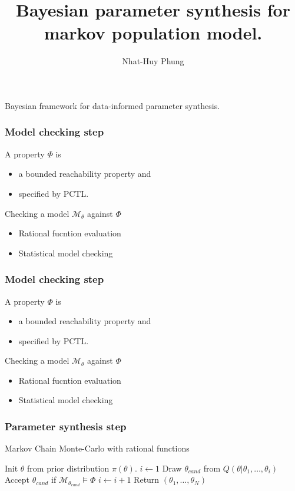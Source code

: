 \documentclass{beamer}
\title{Bayesian parameter synthesis for markov population model.}
\author{Nhat-Huy Phung}
\institute{University of Konstanz}
\begin{document}
\frame{\titlepage}

\begin{frame}
    \begin{center}
        \Huge Bayesian framework for data-informed parameter synthesis.
    \end{center}
\end{frame}

\begin{frame}
    \frametitle{Model checking step}
    A property $\Phi$ is
    \begin{itemize}
        \item a bounded reachability property and
        \item specified by PCTL.
    \end{itemize}
    Checking a model $\mathcal{M}_\theta$ against $\Phi$
    \begin{itemize}
        \item Rational fucntion evaluation
        \item Statistical model checking
    \end{itemize}
\end{frame}

\begin{frame}
    \frametitle{Model checking step}
    A property $\Phi$ is
    \begin{itemize}
        \item a bounded reachability property and
        \item specified by PCTL.
    \end{itemize}
    Checking a model $\mathcal{M}_\theta$ against $\Phi$
    \begin{itemize}
        \item Rational fucntion evaluation
        \item Statistical model checking
    \end{itemize}
\end{frame}

\begin{frame}
    \frametitle{Parameter synthesis step}    
    \begin{algorithm}[H]
        \caption{Markov Chain Monte-Carlo with rational functions}
        \label{rf-mcmc-alg}
        \begin{algorithmic}[1]
            \State Init $\theta$ from prior distribution $\pi(\theta)$.
            \State $i \leftarrow 1$
                \State Draw $\theta_{cand}$ from $Q(\theta|\theta_1,\ldots,\theta_i)$
                    \State Accept $\theta_{cand}$ if $\mathcal{M}_{\theta_{cand}} \models \Phi$
                    \State $i \leftarrow i + 1$
                \EndIf
            \EndWhile
            \State Return $(\theta_1,\ldots,\theta_N)$
            \EndProcedure
        \end{algorithmic}
    \end{algorithm}
\end{frame}
\end{document}
